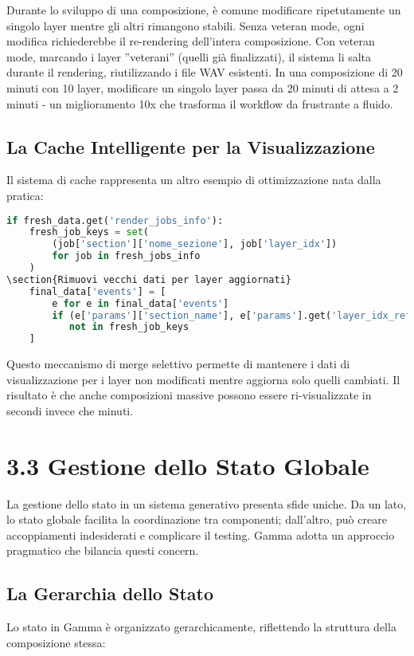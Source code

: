 Durante lo sviluppo di una composizione, è comune modificare ripetutamente un singolo layer mentre gli altri rimangono stabili. Senza veteran mode, ogni modifica richiederebbe il re-rendering dell'intera composizione. Con veteran mode, marcando i layer ''veterani'' (quelli già finalizzati), il sistema li salta durante il rendering, riutilizzando i file WAV esistenti. In una composizione di 20 minuti con 10 layer, modificare un singolo layer passa da 20 minuti di attesa a 2 minuti - un miglioramento 10x che trasforma il workflow da frustrante a fluido.
\subsection{La Cache Intelligente per la Visualizzazione}
Il sistema di cache rappresenta un altro esempio di ottimizzazione nata dalla pratica:

\begin{lstlisting}[language=Python]
if fresh_data.get('render_jobs_info'):
    fresh_job_keys = set(
        (job['section']['nome_sezione'], job['layer_idx']) 
        for job in fresh_jobs_info
    )
\section{Rimuovi vecchi dati per layer aggiornati}
    final_data['events'] = [
        e for e in final_data['events']
        if (e['params']['section_name'], e['params'].get('layer_idx_ref')) 
           not in fresh_job_keys
    ]
\end{lstlisting}

Questo meccanismo di merge selettivo permette di mantenere i dati di visualizzazione per i layer non modificati mentre aggiorna solo quelli cambiati. Il risultato è che anche composizioni massive possono essere ri-visualizzate in secondi invece che minuti.
\section{3.3 Gestione dello Stato Globale}
La gestione dello stato in un sistema generativo presenta sfide uniche. Da un lato, lo stato globale facilita la coordinazione tra componenti; dall'altro, può creare accoppiamenti indesiderati e complicare il testing. Gamma adotta un approccio pragmatico che bilancia questi concern.
\subsection{La Gerarchia dello Stato}
Lo stato in Gamma è organizzato gerarchicamente, riflettendo la struttura della composizione stessa:

